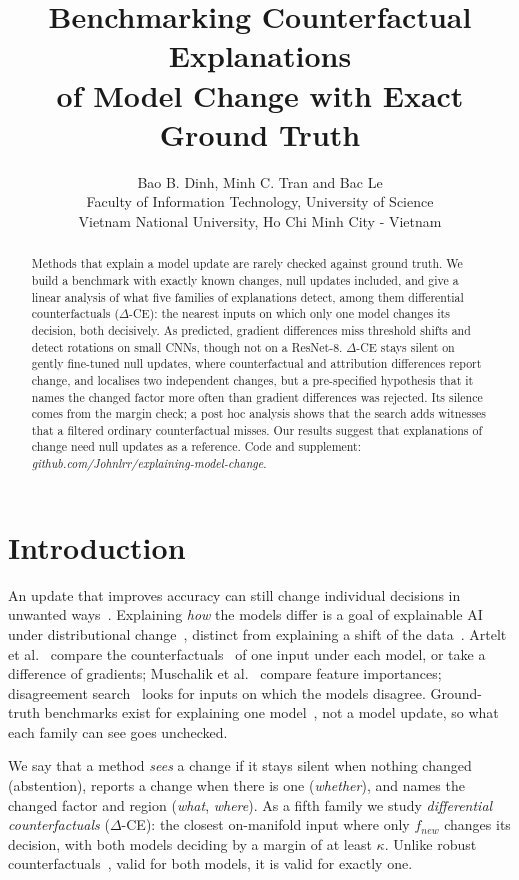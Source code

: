 \documentclass{esannV2}
\title{Benchmarking Counterfactual Explanations\\of Model Change with Exact Ground Truth}
\author{Bao B. Dinh, Minh C. Tran and Bac Le
%
\vspace{.3cm}\\
%
Faculty of Information Technology, University of Science \\
Vietnam National University, Ho Chi Minh City - Vietnam
}
\begin{document}
\maketitle

\begin{abstract}
Methods that explain a model update are rarely checked against ground truth. We build a benchmark with exactly known changes, null updates included, and give a linear analysis of what five families of explanations detect, among them differential counterfactuals ($\Delta$-CE): the nearest inputs on which only one model changes its decision, both decisively. As predicted, gradient differences miss threshold shifts and detect rotations on small CNNs, though not on a ResNet-8. $\Delta$-CE stays silent on gently fine-tuned null updates, where counterfactual and attribution differences report change, and localises two independent changes, but a pre-specified hypothesis that it names the changed factor more often than gradient differences was rejected. Its silence comes from the margin check; a post hoc analysis shows that the search adds witnesses that a filtered ordinary counterfactual misses. Our results suggest that explanations of change need null updates as a reference. Code and supplement: \emph{github.com/Johnlrr/explaining-model-change}.
\end{abstract}

\section{Introduction}

An update that improves accuracy can still change individual decisions in unwanted ways~\cite{yan}. Explaining \emph{how} the models differ is a goal of explainable AI under distributional change~\cite{hammer,kaden}, distinct from explaining a shift of the data~\cite{kulinski}. Artelt et al.~\cite{artelt1,artelt2} compare the counterfactuals~\cite{wachter} of one input under each model, or take a difference of gradients; Muschalik et al.~\cite{muschalik} compare feature importances; disagreement search~\cite{renard,deepxplore,digin} looks for inputs on which the models disagree. Ground-truth benchmarks exist for explaining one model~\cite{openxai,funnybirds,clevrxai}, not a model update, so what each family can see goes unchecked.

We say that a method \emph{sees} a change if it stays silent when nothing changed (abstention), reports a change when there is one (\emph{whether}), and names the changed factor and region (\emph{what}, \emph{where}). As a fifth family we study \emph{differential counterfactuals} ($\Delta$-CE): the closest on-manifold input where only $f_{new}$ changes its decision, with both models deciding by a margin of at least $\kappa$. Unlike robust counterfactuals~\cite{hamman,pawelczyk}, valid for both models, it is valid for exactly one.
\end{document}
